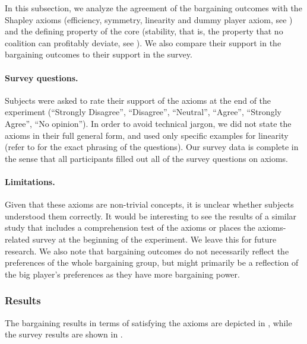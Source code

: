 In this subsection, we analyze the agreement of the bargaining outcomes with the Shapley axioms (efficiency, symmetry, linearity and dummy player axiom, see ) and the defining property of the core (stability, that is, the property that no coalition can profitably deviate, see ). We also compare their support in the bargaining outcomes to their support in the survey.

\paragraph{Survey questions.} Subjects were asked to rate their support of the axioms at the end of the experiment (``Strongly Disagree'', ``Disagree'', ``Neutral'', ``Agree'', ``Strongly Agree'', ``No opinion''). In order to avoid technical jargon, we did not state the axioms in their full general form, and used only specific examples for linearity (refer to  for the exact phrasing of the questions). Our survey data is complete in the sense that all participants filled out all of the survey questions on axioms.

\paragraph{Limitations.}
Given that these axioms are non-trivial concepts, it is unclear whether subjects understood them correctly. It would be interesting to see the results of a similar study that includes a comprehension test of the axioms or places the axioms-related survey at the beginning of the experiment. We leave this for future research. 
We also note that bargaining outcomes do not necessarily reflect the preferences of the whole bargaining group, but might primarily be a reflection of the big player's preferences as they have more bargaining power.

\subsubsection{Results}

The bargaining results in terms of satisfying the axioms are depicted in , while the survey results are shown in . 

